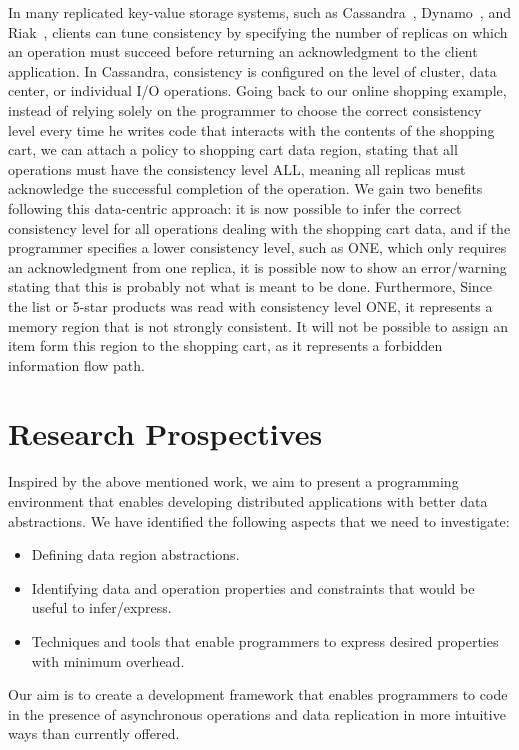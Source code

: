 \documentclass[]{usiinfprospectus}
\begin{document}
In many replicated key-value storage systems, such as Cassandra~\cite{lakshman2010cassandra}, Dynamo~\cite{hastorun2007dynamo}, and Riak~\cite{redmond2012seven}, clients can tune consistency by specifying the number of replicas on which an operation must succeed before returning an acknowledgment to the client application. In Cassandra, consistency is configured on the level of cluster, data center, or individual I/O operations. Going back to our online shopping example, instead of relying solely on the programmer to choose the correct consistency level every time he writes code that interacts with the contents of the shopping cart, we can attach a policy to shopping cart data region, stating that all operations must have the consistency level ALL, meaning all replicas must acknowledge the successful completion of the operation. We gain two benefits following this data-centric approach: it is now possible to infer the correct consistency level for all operations dealing with the shopping cart data, and if the programmer specifies a lower consistency level, such as ONE, which only requires an acknowledgment from one replica, it is possible now to show an error/warning stating that this is probably not what is meant to be done. Furthermore, Since the list or 5-star products was read with consistency level ONE, it represents a memory region that is not strongly consistent. It will not be possible to assign an item form this region to the shopping cart, as it represents a forbidden information flow path. 
\section{Research Prospectives}

Inspired by the above mentioned work, we aim to present a programming environment that enables developing distributed applications with better data abstractions. We have identified the following aspects that we need to investigate: 

\begin{itemize}
	\item Defining data region abstractions.
	\item Identifying data and operation properties and constraints that would be useful to infer/express.
	\item Techniques and tools that enable programmers to express desired properties with minimum overhead.
\end{itemize}	

Our aim is to create a development framework that enables programmers to code in the presence of asynchronous operations and data replication in more intuitive ways than currently offered. 
\end{document}

